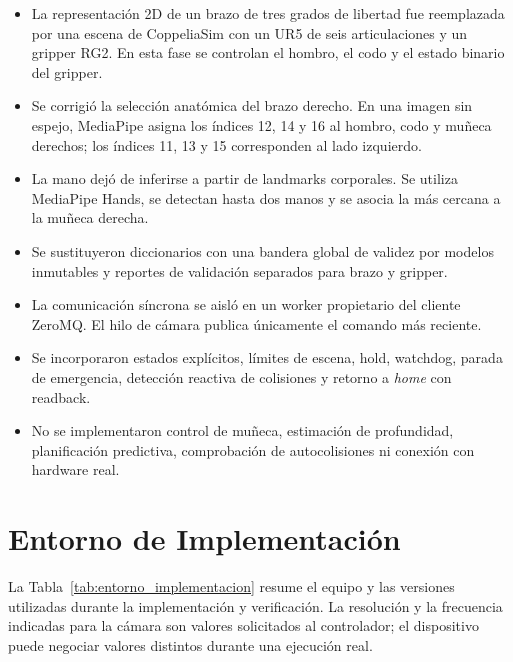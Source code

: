 \begin{itemize}
    \item La representación 2D de un brazo de tres grados de libertad fue
    reemplazada por una escena de CoppeliaSim con un UR5 de seis articulaciones
    y un gripper RG2. En esta fase se controlan el hombro, el codo y el estado
    binario del gripper.
    \item Se corrigió la selección anatómica del brazo derecho. En una imagen
    sin espejo, MediaPipe asigna los índices 12, 14 y 16 al hombro, codo y
    muñeca derechos; los índices 11, 13 y 15 corresponden al lado izquierdo.
    \item La mano dejó de inferirse a partir de landmarks corporales. Se utiliza
    MediaPipe Hands, se detectan hasta dos manos y se asocia la más cercana a la
    muñeca derecha.
    \item Se sustituyeron diccionarios con una bandera global de validez por
    modelos inmutables y reportes de validación separados para brazo y gripper.
    \item La comunicación síncrona se aisló en un worker propietario del cliente
    ZeroMQ. El hilo de cámara publica únicamente el comando más reciente.
    \item Se incorporaron estados explícitos, límites de escena, hold, watchdog,
    parada de emergencia, detección reactiva de colisiones y retorno a
    \textit{home} con readback.
    \item No se implementaron control de muñeca, estimación de profundidad,
    planificación predictiva, comprobación de autocolisiones ni conexión con
    hardware real.
\end{itemize}

\section{Entorno de Implementación}
\label{sec:entorno_implementacion}

La Tabla~\ref{tab:entorno_implementacion} resume el equipo y las versiones
utilizadas durante la implementación y verificación. La resolución y la
frecuencia indicadas para la cámara son valores solicitados al controlador; el
dispositivo puede negociar valores distintos durante una ejecución real.

